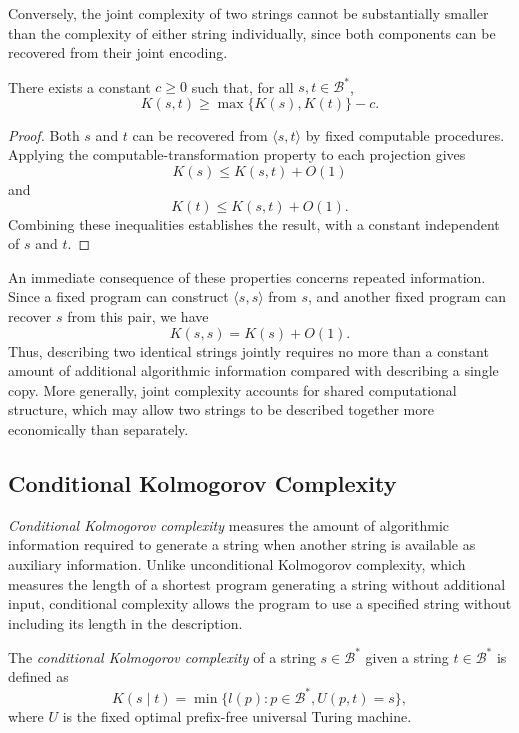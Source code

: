 Conversely, the joint complexity of two strings cannot be substantially smaller than the complexity of either string individually, since both components can be recovered from their joint encoding.

\begin{proposition}
\label{prop:excess_kolmogorov}
There exists a constant $c\geq 0$ such that, for all
$s,t\in\mathcal{B}^*$,
\[
K(s,t)\geq\max\{K(s),K(t)\}-c.
\]
\end{proposition}
\begin{proof}
Both $s$ and $t$ can be recovered from $\langle s,t\rangle$ by fixed computable procedures. Applying the computable-transformation property to each projection gives
\[
K(s)\leq K(s,t)+O(1)
\]
and
\[
K(t)\leq K(s,t)+O(1).
\]
Combining these inequalities establishes the result, with a constant independent of $s$ and $t$.
\end{proof}

An immediate consequence of these properties concerns repeated information. Since a fixed program can construct $\langle s,s\rangle$ from $s$, and another fixed program can recover $s$ from this pair, we have
\[
K(s,s)=K(s)+O(1).
\]
Thus, describing two identical strings jointly requires no more than a constant amount of additional algorithmic information compared with describing a single copy. More generally, joint complexity accounts for shared computational structure, which may allow two strings to be described together more economically than separately.


\subsection*{Conditional Kolmogorov Complexity}
\label{sec:conditional_kolmogorov_complexity}

\emph{Conditional Kolmogorov complexity} measures the amount of algorithmic information required to generate a string when another string is available as auxiliary information. Unlike unconditional Kolmogorov complexity, which measures the length of a shortest program generating a string without additional input, conditional complexity allows the program to use a specified string without including its length in the description.

\begin{definition}
\label{def:Conditional-Kolmogorov-Complexity}
The \emph{conditional Kolmogorov complexity} of a string $s \in \mathcal{B}^*$ given a string $t \in \mathcal{B}^*$ is defined as
\[
K(s \mid t) = \min\{l(p) : p \in \mathcal{B}^*, U(p,t)=s\},
\]
where $U$ is the fixed optimal prefix-free universal Turing machine.
\end{definition}

